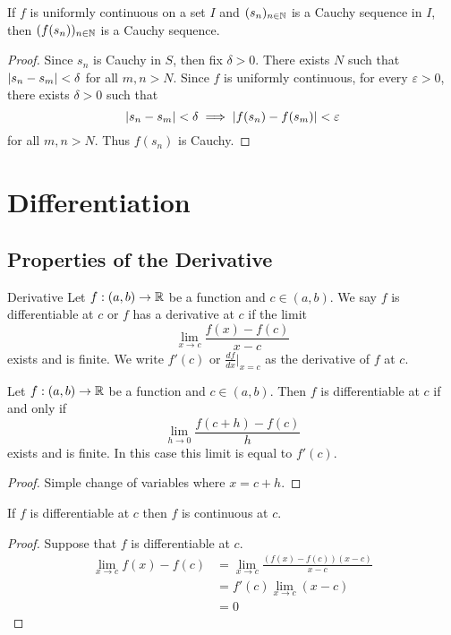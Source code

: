 \documentclass[a4paper]{article}
\begin{document}
\begin{thm}{}{} If $f$ is uniformly continuous on a set $I$ and $(s_n)_{n\in\mathbb{N}}$ is a Cauchy sequence in $I$, then $(f(s_n))_{n\in\mathbb{N}}$ is a Cauchy sequence. \tcbline
\begin{proof} Since $s_n$ is Cauchy in $S$, then fix $\delta>0$. There exists $N$ such that $\abs{s_n-s_m}<\delta$ for all $m,n>N$. Since $f$ is uniformly continuous, for every $\varepsilon>0$, there exists $\delta>0$ such that $$\abs{s_n-s_m}<\delta\implies\abs{f(s_n)-f(s_m)}<\varepsilon$$ for all $m,n>N$. Thus $f(s_n)$ is Cauchy. 
\end{proof}
\end{thm}

\pagebreak
\section{Differentiation}
\subsection{Properties of the Derivative}
\begin{defn}{Derivative}{} Let $f:(a,b)\to\mathbb{R}$ be a function and $c\in(a,b)$. We say $f$ is differentiable at $c$ or $f$ has a derivative at $c$ if the limit $$\lim_{x\to c}\frac{f(x)-f(c)}{x-c}$$ exists and is finite. We write $f'(c)$ or $\frac{df}{dx}\vert_{x=c}$ as the derivative of $f$ at $c$. 
\end{defn}

\begin{prp}{}{} Let $f:(a,b)\to\mathbb{R}$ be a function and $c\in(a,b)$. Then $f$ is differentiable at $c$ if and only if $$\lim_{h\to 0}\frac{f(c+h)-f(c)}{h}$$ exists and is finite. In this case this limit is equal to $f'(c)$. \tcbline
\begin{proof}
Simple change of variables where $x=c+h$. 
\end{proof}
\end{prp}

\begin{prp}{}{} If $f$ is differentiable at $c$ then $f$ is continuous at $c$. \tcbline
\begin{proof} Suppose that $f$ is differentiable at $c$. 
\begin{align*}
\lim_{x\to c}f(x)-f(c)&=\lim_{x\to c}\frac{(f(x)-f(c))(x-c)}{x-c}\\
&=f'(c)\lim_{x\to c}(x-c)\\
&=0
\end{align*}
\end{proof}
\end{prp}
\end{document}

